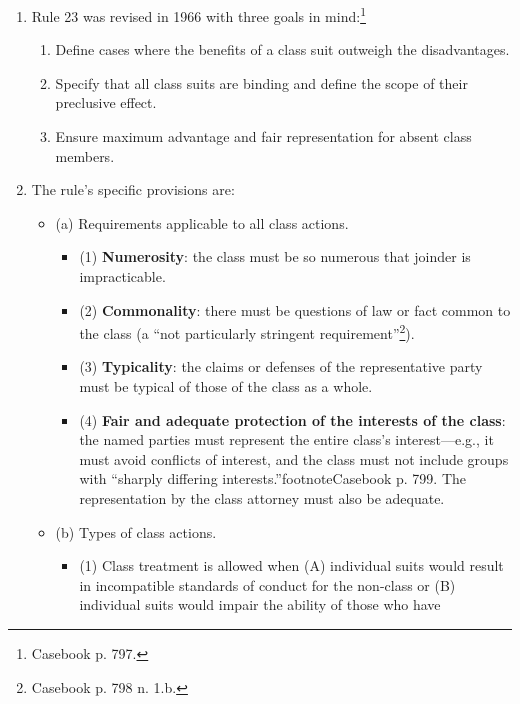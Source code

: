 \begin{enumerate}
    \item Rule 23 was revised in 1966 with three goals in
    mind:\footnote{Casebook p. 797.}
    \begin{enumerate}
        \item Define cases where the benefits of a class suit outweigh the
        disadvantages.
        \item Specify that all class suits are binding and define the scope of
        their preclusive effect.
        \item Ensure maximum advantage and fair representation for absent
        class members.
    \end{enumerate}
    \item The rule's specific provisions are:
    \begin{itemize}
        \item (a) Requirements applicable to all class actions.
        \begin{itemize}
            \item (1) \textbf{Numerosity}: the class must be so numerous that 
            joinder is impracticable.
            \item (2) \textbf{Commonality}: there must be questions of law or 
            fact common to the class (a ``not particularly stringent 
            requirement''\footnote{Casebook p. 798 n. 1.b.}).
            \item (3) \textbf{Typicality}: the claims or defenses of the 
            representative party must be typical of those of the class as a 
            whole.
            \item (4) \textbf{Fair and adequate protection of the interests of 
            the class}: the named parties must represent the entire class's 
            interest---e.g., it must avoid conflicts of interest, and the 
            class must not include groups with ``sharply differing 
            interests.''footnote{Casebook p. 799.} The representation by the 
            class attorney must also be adequate.
        \end{itemize}
        \item (b) Types of class actions.
        \begin{itemize}
            \item (1) Class treatment is allowed when (A) individual suits would
            result in incompatible standards of conduct for the non-class or
            (B) individual suits would impair the ability of those who have

\end{itemize}
\end{itemize}
\end{enumerate}
